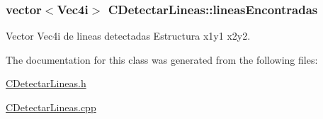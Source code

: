\subsubsection[{\texorpdfstring{lineas\+Encontradas}{lineasEncontradas}}]{\setlength{\rightskip}{0pt plus 5cm}vector$<$Vec4i$>$ C\+Detectar\+Lineas\+::lineas\+Encontradas\hspace{0.3cm}{\ttfamily [private]}}\hypertarget{classCDetectarLineas_a1aab2cfd627e2d3eef1650837ab61436}{}\label{classCDetectarLineas_a1aab2cfd627e2d3eef1650837ab61436}


Vector Vec4i de lineas detectadas Estructura x1y1 x2y2. 



The documentation for this class was generated from the following files\+:\begin{DoxyCompactItemize}
\item 
\hyperlink{CDetectarLineas_8h}{C\+Detectar\+Lineas.\+h}\item 
\hyperlink{CDetectarLineas_8cpp}{C\+Detectar\+Lineas.\+cpp}\end{DoxyCompactItemize}
